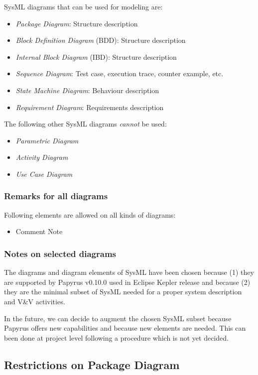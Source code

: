 SysML diagrams that can be used for modeling are:
\begin{itemize}
\item \emph{Package Diagram}: Structure description
\item \emph{Block Definition Diagram} (BDD): Structure description
\item \emph{Internal Block Diagram} (IBD): Structure description
\item \emph{Sequence Diagram}: Test case, execution trace, counter
  example, etc.
\item \emph{State Machine Diagram}: Behaviour description
\item \emph{Requirement Diagram}: Requirements description
\end{itemize}

The following other SysML diagrams \emph{cannot} be used:
\begin{itemize}
\item \emph{Parametric Diagram}
\item \emph{Activity Diagram}
\item \emph{Use Case Diagram}
\end{itemize}

\subsubsection{Remarks for all diagrams}

Following elements are allowed on all kinds of diagrams:
\begin{itemize}
\item Comment Note
\end{itemize}

\subsubsection{Notes on selected diagrams}

The diagrams and diagram elements of SysML have been chosen because
(1) they are supported by Papyrus v0.10.0 used in Eclipse Kepler
release and because (2) they are the minimal subset of SysML needed
for a proper system description and V\&V activities.

In the future, we can decide to augment the chosen SysML subset
because Papyrus offers new capabilities and because new elements are
needed. This can been done at project level following a procedure
which is not yet decided.

\subsection{Restrictions on Package Diagram}

